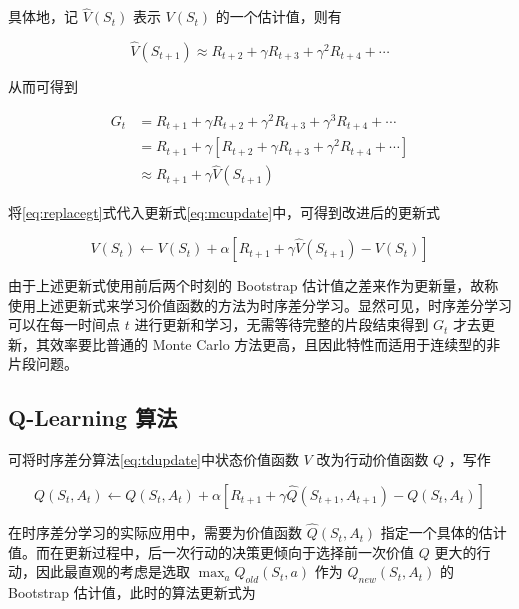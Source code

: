 具体地，记 $\widehat{V}(S_{t})$ 表示 $V({S_t})$ 的一个估计值，则有

\begin{equation}
    \widehat{V}(S_{t+1}) \approx R_{t+2} + \gamma R_{t+3} + \gamma^2 R_{t+4} + \cdots
\end{equation}

从而可得到

\begin{equation}\label{eq:replacegt}
    \begin{aligned}
        G_t &= R_{t+1}+\gamma R_{t+2}+\gamma^2 R_{t+3}+\gamma^3 R_{t+4}+\cdots\\
        &=R_{t+1}+\gamma\left[R_{t+2}+\gamma R_{t+3}+\gamma^2 R_{t+4}+\cdots\right]\\
        &\approx R_{t+1} +\gamma \widehat{V}(S_{t+1})
    \end{aligned}
\end{equation}

将\ref{eq:replacegt}式代入更新式\ref{eq:mcupdate}中，可得到改进后的更新式

\begin{equation}\label{eq:tdupdate}
    V(S_t)\leftarrow V(S_t)+\alpha\left[R_{t+1}+\gamma \widehat{V}(S_{t+1})-V(S_t)\right]
\end{equation}

由于上述更新式使用前后两个时刻的 Bootstrap 估计值之差来作为更新量，故称使用上述更新式来学习价值函数的方法为{\jiacu 时序差分学习}。显然可见，时序差分学习可以在每一时间点 $t$ 进行更新和学习，无需等待完整的片段结束得到 $G_t$ 才去更新，其效率要比普通的 Monte Carlo 方法更高，且因此特性而适用于连续型的非片段问题。

\subsection{Q-Learning 算法}

可将时序差分算法\ref{eq:tdupdate}中状态价值函数 $V$ 改为行动价值函数 $Q$ ，写作

\begin{equation}
    Q(S_t,A_t)\leftarrow Q(S_t,A_t)+\alpha\left[R_{t+1}+\gamma \widehat{Q}(S_{t+1},A_{t+1})-Q(S_t,A_t)\right]
\end{equation}

在时序差分学习的实际应用中，需要为价值函数 $\widehat{Q}(S_t,A_t)$ 指定一个具体的估计值。而在更新过程中，后一次行动的决策更倾向于选择前一次价值 $Q$ 更大的行动，因此最直观的考虑是选取 $\max_a Q_{old}(S_t,a)$ 作为 $Q_{new}(S_t,A_t)$ 的 Bootstrap 估计值，此时的算法更新式为

